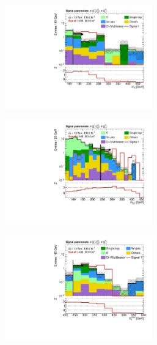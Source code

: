 \begin{figure}
	\centering
	\begin{subfigure}[b]{0.5\linewidth}
		\centering\includegraphics[width=0.7\textwidth]{N-1_cut_scan/n1_400_200/mt}
		\caption{}
	\end{subfigure}\hfill
	\begin{subfigure}[b]{0.5\linewidth}
		\centering\includegraphics[width=0.7\textwidth]{N-1_cut_scan/n1_400_200/mct}
		\caption{}
	\end{subfigure}\hfill
	\begin{subfigure}[b]{0.5\linewidth}
		\centering\includegraphics[width=0.7\textwidth]{N-1_cut_scan/n1_400_200/met}

\end{subfigure}
\end{figure}
